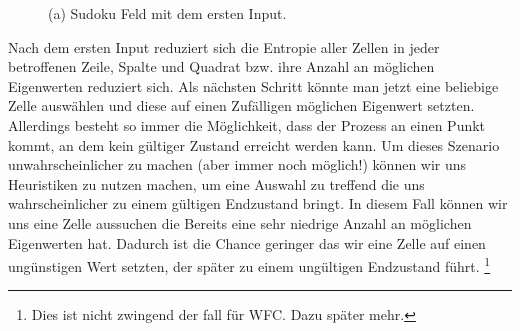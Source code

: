 \documentclass[12pt]{report}
\begin{document}
\begin{figure}[H]
    \centering
    \caption{(a) Sudoku Feld mit dem ersten Input.}%
\end{figure}

Nach dem ersten Input reduziert sich die Entropie aller Zellen in jeder betroffenen Zeile,
Spalte und Quadrat bzw. ihre Anzahl an möglichen Eigenwerten reduziert sich.
Als nächsten Schritt könnte man jetzt eine beliebige Zelle auswählen und diese auf einen Zufälligen möglichen Eigenwert setzten.
Allerdings besteht so immer die Möglichkeit, dass der Prozess an einen Punkt kommt, an dem kein gültiger Zustand erreicht werden kann.
Um dieses Szenario unwahrscheinlicher zu machen {(aber immer noch möglich!)} können wir uns Heuristiken zu nutzen machen,
um eine Auswahl zu treffend die uns wahrscheinlicher zu einem gültigen Endzustand bringt.
In diesem Fall können wir uns eine Zelle aussuchen die Bereits eine sehr niedrige Anzahl an möglichen Eigenwerten hat.
Dadurch ist die Chance geringer das wir eine Zelle auf einen ungünstigen Wert setzten, der später zu einem ungültigen Endzustand führt.
\footnote[2]{Dies ist nicht zwingend der fall für WFC. Dazu später mehr.}
\end{document}
